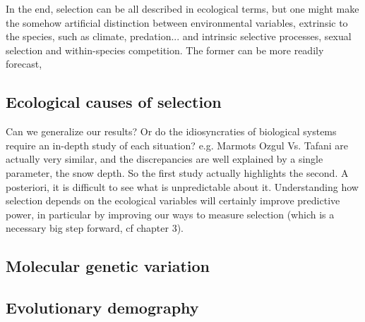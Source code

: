 In the end, selection can be all described in ecological terms, but one might make the somehow artificial distinction between environmental variables, extrinsic to the species, such as climate, predation... and intrinsic selective processes, sexual selection and within-species competition. 
The former can be more readily forecast, 

\subsection{Ecological causes of selection}

Can we generalize our results? Or do the idiosyncraties of biological systems require an in-depth study of each situation? 
e.g. Marmots Ozgul Vs. Tafani are actually very similar, and the discrepancies are well explained by a single parameter, the snow depth. So the first study actually highlights the second. A posteriori, it is difficult to see what is unpredictable about it.
Understanding how selection depends on the ecological variables will certainly improve predictive power, in particular by improving our ways to measure selection (which is a necessary big step forward, cf chapter 3).

\subsection{Molecular genetic variation}

\subsection{Evolutionary demography}